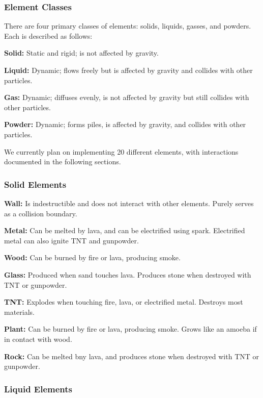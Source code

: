 \documentclass[12pt]{article}
\begin{document}
    \subsubsection{Element Classes}

    There are four primary classes of elements: solids, liquids, gasses, and powders.
    Each is described as follows:

    \textbf{Solid:} Static and rigid; is not affected by gravity.

    \textbf{Liquid:} Dynamic; flows freely but is affected by gravity and
    collides with other particles.
    
    \textbf{Gas:} Dynamic; diffuses evenly, is not affected by gravity but still
    collides with other particles.

    \textbf{Powder:} Dynamic; forms piles, is affected by gravity, and collides
    with other particles.

    \vspace{0.5cm}

    We currently plan on implementing 20 different elements, with interactions
    documented in the following sections.

    \subsubsection{Solid Elements}

    \textbf{Wall:} Is indestructible and does not interact with other elements.
    Purely serves as a collision boundary.

    \textbf{Metal:} Can be melted by lava, and can be electrified using spark.
    Electrified metal can also ignite TNT and gunpowder.

    \textbf{Wood:} Can be burned by fire or lava, producing smoke.

    \textbf{Glass:} Produced when sand touches lava. Produces stone when
    destroyed with TNT or gunpowder.
    
    \textbf{TNT:} Explodes when touching fire, lava, or electrified metal.
    Destroys most materials.

    \textbf{Plant:} Can be burned by fire or lava, producing smoke.
    Grows like an amoeba if in contact with wood.

    \textbf{Rock:} Can be melted bny lava, and produces stone when destroyed
    with TNT or gunpowder.

    \subsubsection{Liquid Elements}
\end{document}
